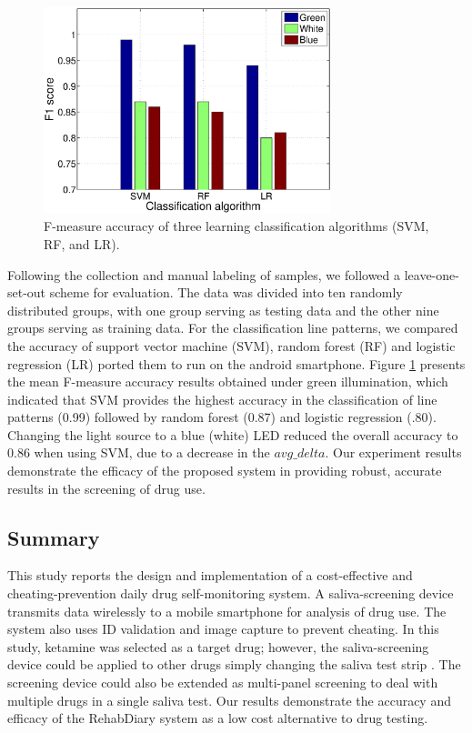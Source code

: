 \begin{figure}[ht]
\begin{center}
\includegraphics[height=6cm]{image/ket/detection_accuracy.eps}
\caption{F-measure accuracy of three learning classification algorithms (SVM, RF, and LR).}
\label{fig:detection_accuracy}
\end{center}
\end{figure}

Following the collection and manual labeling of samples, we followed a leave-one-set-out scheme for evaluation. The data was divided into ten randomly distributed groups, with one group serving as testing data and the other nine groups serving as training data. For the classification line patterns, we compared the accuracy of support vector machine (SVM), random forest (RF) and logistic regression (LR) ported them to run on the android smartphone. Figure \ref{fig:detection_accuracy} presents the mean F-measure accuracy results obtained under green illumination, which indicated that SVM provides the highest accuracy in the classification of line patterns (0.99) followed by random forest (0.87) and logistic regression (.80). Changing the light source to a blue (white) LED reduced the overall accuracy to 0.86 when using SVM, due to a decrease in the $avg\_delta$. Our experiment results demonstrate the efficacy of the proposed system in providing robust, accurate results in the screening of drug use.

\subsection{Summary}
This study reports the design and implementation of a cost-effective and cheating-prevention daily drug self-monit\-oring system. A saliva-screening device transmits data wirelessly to a mobile smartphone for analysis of drug use. The system also uses ID validation and image capture to prevent cheating.
In this study, ketamine was selected as a target drug; however, the saliva-screening device could be applied to other drugs simply changing the saliva test strip \cite{drugscan}. The screening device could also be extended as multi-panel screening to deal with multiple drugs in a single saliva test. Our results demonstrate the accuracy and efficacy of the RehabDiary system as a low cost alternative to drug testing.

\let\cleardoublepage\clearpage
